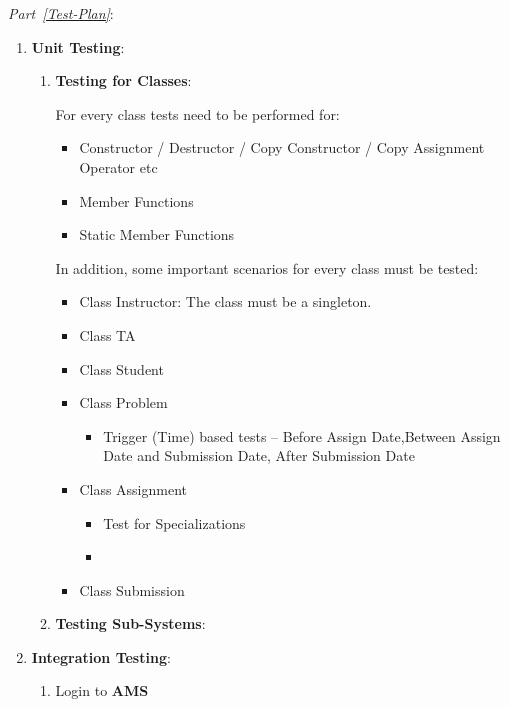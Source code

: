 \documentclass{article}
\begin{document}
\begin{enumerate}
{\em Part~\ref{Test-Plan}}: 
\begin{enumerate}
\item {\bf Unit Testing}:
\begin{enumerate}
\item {\bf Testing for Classes}: 

For every class tests need to be performed for:
\begin{itemize}
\item Constructor / Destructor / Copy Constructor / Copy Assignment Operator etc
\item Member Functions
\item Static Member Functions
\end{itemize}
In addition, some important scenarios for every class must be tested:
\begin{itemize}

\item Class Instructor: The class must be a singleton.
\item Class TA 
\item Class Student 
\item Class Problem 
\begin{itemize}
\item Trigger (Time) based tests -- Before Assign Date,Between Assign Date and Submission Date, After Submission Date

\end{itemize}
\item Class Assignment 
\begin{itemize}
\item Test for Specializations 
\item 
\end{itemize}
\item Class Submission 

\end{itemize}
\item {\bf Testing Sub-Systems}:
\end{enumerate}

\item {\bf Integration Testing}:
\begin{enumerate}
\item Login to {\bf AMS}

\end{enumerate}
\end{enumerate}



\end{enumerate}
\end{document}
